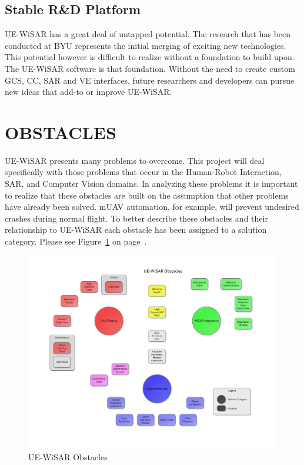 \documentclass[12pt]{IEEEtran}
\begin{document}
\subsection{Stable R\&D Platform}
UE-WiSAR has a great deal of untapped potential.  The research that has been
conducted at BYU represents the initial merging of exciting new technologies.  This
potential however is difficult to realize without a foundation to build upon. 
The UE-WiSAR software is that foundation.  Without the need to create custom
GCS, CC, SAR and VE interfaces, future researchers and developers can pursue
new ideas that add-to or improve UE-WiSAR.

\section{OBSTACLES}
UE-WiSAR presents many problems to overcome.  This project will
deal specifically with those problems that occur in the Human-Robot Interaction,
SAR, and Computer Vision domains.  In analyzing these problems it is important
to realize that these obstacles are built on the assumption that other problems
have already been solved.  mUAV automation, for example, will prevent undesired
crashes during normal flight.  To better describe these obstacles and their
relationship to UE-WiSAR each obstacle has been assigned to a solution category.
Please see Figure~\ref{fig:obstaclemap} on page~\pageref{fig:obstaclemap}.

\begin{figure}[htp]
	\vspace{-80pt}
	\hspace{-80pt}
	\includegraphics[keepaspectratio=true, width=\paperheight,
	height=\paperheight, page=1, angle=90, scale=0.95,
	trim=20 0 20 0]{obstacle_solution_map.pdf}
	\caption{UE-WiSAR Obstacles}
	\label{fig:obstaclemap}
\end{figure}
\end{document}
